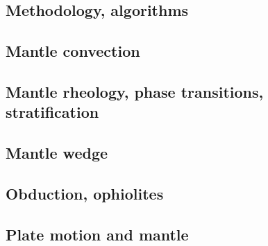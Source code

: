 \cite{yatd12}

\subsection*{Methodology, algorithms}

\cite{leka93}

\subsection*{Mantle convection}

\cite{hemw75}
\cite{ludt79}
\cite{olco80}\cite{jamc80}
\cite{jape82}\cite{homc82}
\cite{hous83}\cite{hous83b}
\cite{olyb84}\cite{jarv84}\cite{haeb84}\cite{harp84}\cite{davi84}
\cite{jarv85}
\cite{davi86}
\cite{yuqh87}
\cite{zhch93}\cite{jarv93}
\cite{haeb94}
\cite{zhgu95}
\cite{zhyu96}\cite{hond96}
\cite{hond97}\cite{iwho97}
\cite{ande98}\cite{iwho98}\cite{devv98}
\cite{duyr99}
\cite{albe00}\cite{hayu00}\cite{devv00b}
\cite{zhzm00}
\cite{hapa03}
\cite{nake07}
\cite{lowm11}
\cite{holj13}\cite{dadb13}
\cite{arfw14}\cite{helo14}

\subsection*{Mantle rheology, phase transitions, stratification}

\cite{yusb82}
\cite{zhyh92}
\cite{zhyu95}
\cite{java11}

\subsection*{Mantle wedge}

\cite{leki09}
\cite{ledg14}

\subsection*{Obduction, ophiolites}

\cite{hack90}
\cite{hack91}
\cite{agzf14}

\subsection*{Plate motion and mantle}

